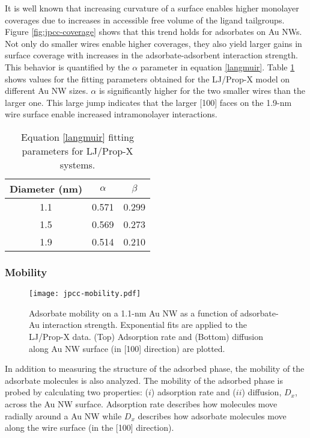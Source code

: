 \documentclass[10pt]{report}  %
\newcommand\findent{\hspace*{\parindent}}
\newcommand{\T}{\rule{0pt}{2.6ex}}
\newcommand{\B}{\rule[-1.2ex]{0pt}{0pt}}
\begin{document}
It is well known that increasing curvature of a surface enables higher monolayer coverages due to increases in accessible free volume of the ligand tailgroups.\cite{Hostetler:1998,Singh:2007,Jimenez:2010}  Figure \ref{fig:jpcc-coverage} shows that this trend holds for adsorbates on Au NWs.  Not only do smaller wires enable higher coverages, they also yield larger gains in surface coverage with increases in the adsorbate-adsorbent interaction strength.  This behavior is quantified by the $\alpha$ parameter in equation \ref{langmuir}.  Table \ref{table:coverage} shows values for the fitting parameters obtained for the LJ/Prop-X model on different Au NW sizes.  $\alpha$ is significantly higher for the two smaller wires than the larger one.  This large jump indicates that the larger [100] faces on the 1.9-nm wire surface enable increased intramonolayer interactions.

%
%
\begin{table} [b!] 
\caption{Equation \ref{langmuir} fitting parameters for LJ/Prop-X systems.}
\centering
\begin{tabular}{ c c c }
	\hline
        \hline
Diameter (nm) \T \B & $\alpha$ & $\beta$ \\
	\hline
1.1 \T \B & 0.571 & 0.299  \\
1.5 \T \B & 0.569 & 0.273  \\
1.9 \T \B & 0.514 & 0.210  \\
	\hline
        \hline
\end{tabular}
\label{table:coverage}
\end{table}        

\subsubsection{Mobility} %

%
%
\begin{figure}[b!]
	\centering
	\texttt{[image: jpcc-mobility.pdf]}
	\caption{Adsorbate mobility on a 1.1-nm Au NW as a function of adsorbate-Au interaction strength.  Exponential fits are applied to the LJ/Prop-X data. (Top) Adsorption rate and (Bottom) diffusion along Au NW surface (in [100] direction) are plotted.}
	\label{fig:jpcc-mobility}
\end{figure}

\findent In addition to measuring the structure of the adsorbed phase, the mobility of the adsorbate molecules is also analyzed.  The mobility of the adsorbed phase is probed by calculating two properties: ($i$) adsorption rate and ($ii$) diffusion, $D_x$, across the Au NW surface.  Adsorption rate describes how molecules move radially around a Au NW while $D_x$ describes how adsorbate molecules move along the wire surface (in the [100] direction).
\end{document}
